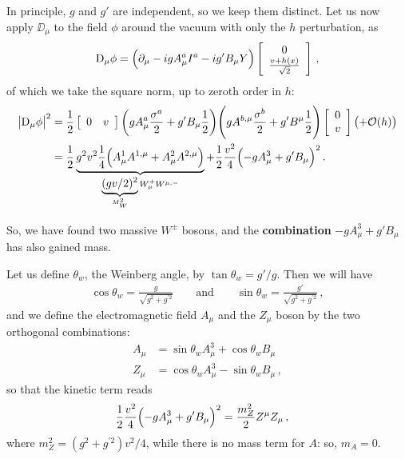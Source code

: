\documentclass[main.tex]{subfiles}
\begin{document}
In principle, \(g\) and \(g'\) are independent, so we keep them distinct. Let us now apply \(\DD_{\mu } \) to the field \(\phi \) around the vacuum with only the \(h \) perturbation, as 
%
\begin{align}
\mathrm{D}_{\mu } \phi = \qty(\partial_{\mu } 
- i g A^{a}_{\mu } I^{a} 
- i g' B_{\mu } Y
) \left[\begin{array}{c}
0 \\ 
\frac{v + h(x)}{\sqrt{2}}
\end{array}\right]
\,,
\end{align}
%
of which we take the square norm, up to zeroth order in \(h\): 
%
\begin{align}
\abs{\mathrm{D}_{\mu } \phi }^2
&= \frac{1}{2} \left[\begin{array}{cc}
0 & v
\end{array}\right]
\qty(g A^{a}_{\mu } \frac{\sigma^{a}}{2} + g' B_{\mu } \frac{1}{2})
\qty(g A^{b, \mu } \frac{\sigma^{b}}{2} + g' B^{\mu } \frac{1}{2})
\left[\begin{array}{c}
0 \\ 
v
\end{array}\right] \qty(+ \mathcal{O}(h)) \\
&= \frac{1}{2} \underbrace{ g^2v^2  \frac{1}{4} 
\qty(A^{1}_{\mu } A^{1, \mu } + A^{2}_{\mu } A^{2, \mu })}_{\underbrace{(gv/2)^2}_{M_W^2} W^{+}_{\mu } W^{\mu, -}}
+ \frac{1}{2} \frac{v^2}{4} 
\qty(- g A^{3}_{\mu } + g' B_{\mu })^2
\,.
\end{align}

So, we have found two massive \(W^{\pm}\) bosons, and the \textbf{combination} \(- g A^{3}_{\mu } + g' B_{\mu }\) has also gained mass. 

Let us define \(\theta_{w}\), the Weinberg angle, by \(\tan \theta_{w} = g ' / g\). 
Then we will have 
%
\begin{align}
\cos \theta_{w} = \frac{g}{\sqrt{g^2 + g^{\prime 2}}}
\qquad \text{and} \qquad
\sin \theta_{w} = \frac{g'}{\sqrt{g^2 + g^{\prime 2}}}
\,,
\end{align}
%
and we define the electromagnetic field \(A_{\mu }\) and the \(Z_{\mu }\) boson by the two orthogonal combinations: 
%
\begin{align}
A_{\mu } &= \sin \theta_{w} A^{3}_{\mu } + \cos \theta_{w} B_\mu \\
Z_{\mu } &= \cos \theta_{w} A^{3}_{\mu } - \sin \theta_{w} B_\mu  
\,,
\end{align}
%
so that the kinetic term reads 
%
\begin{align}
\frac{1}{2} \frac{v^2}{4} \qty(- g A^{3}_{\mu } + g' B_{\mu })^2 
&= \frac{m_Z^2}{2} Z^{\mu }Z_{\mu } 
\,,
\end{align}
%
where \(m_Z^2 = (g^2 + g^{\prime 2}) v^2/ 4 \), while there is no mass term for \(A\): so, \(m_A = 0\).
\end{document}
